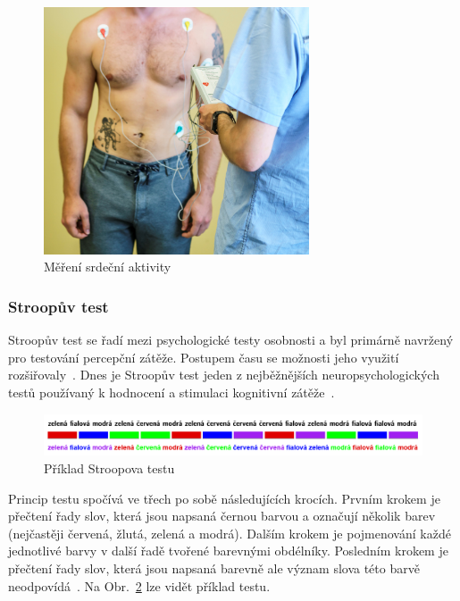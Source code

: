 \begin{figure}[h]
    \begin{center}
        \includegraphics[width=0.7\textwidth]{../assets/device/holter2}
        \caption{Měření srdeční aktivity}
        \label{fig:device_usage}
    \end{center}
\end{figure}

\subsubsection{Stroopův test}
\label{section:stroop_test}
Stroopův test se řadí mezi psychologické testy osobnosti a byl primárně navržený
pro testování percepční zátěže. Postupem času se možnosti jeho využití
rozšiřovaly~\cite{Svoboda1999}. Dnes je Stroopův test jeden z nejběžnějších
neuropsychologických testů používaný k hodnocení  a stimulaci kognitivní
zátěže~\cite{Scarpina2017}.

\begin{figure}[h]
    \begin{center}
        \includegraphics[width=1\textwidth]{../assets/figures/stroop}
        \caption{Příklad Stroopova testu~\cite{stroopWiki}}
        \label{fig:stroop}
    \end{center}
\end{figure}

Princip testu spočívá ve třech po sobě následujících krocích. Prvním krokem je
přečtení řady slov, která jsou napsaná černou barvou a označují několik barev
(nejčastěji červená, žlutá, zelená a modrá). Dalším krokem je pojmenování každé
jednotlivé barvy v další řadě tvořené barevnými obdélníky. Posledním krokem je
přečtení řady slov, která jsou napsaná barevně ale význam slova této barvě
neodpovídá~\cite{Svoboda1999}. Na Obr.~\ref{fig:stroop} lze vidět příklad testu.

